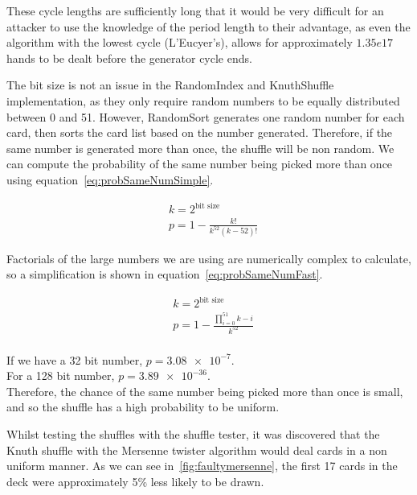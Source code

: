 These cycle lengths are sufficiently long that it would be very difficult
for an attacker to use the knowledge of the period length to their advantage,
as even the algorithm with the lowest cycle (L'Eucyer's), allows for
approximately $1.35e17$ hands to be dealt before the generator cycle ends.

The bit size is not an issue in the RandomIndex and KnuthShuffle
implementation, as they only require random numbers to be equally distributed
between 0 and 51. However, RandomSort generates one random number for each
card, then sorts the card list based on the number generated. Therefore, if
the same number is generated more than once, the shuffle will be non random.
We can compute the probability of the same number being picked more than once
using equation~\ref{eq:probSameNumSimple}.

\begin{equation} \label{eq:probSameNumSimple}
\begin{split}
& k = 2^\text{bit size}\\
& p = 1 - \frac{k!}{{k^{52}}(k - 52)!}
\end{split}
\end{equation}

Factorials of the large numbers we are using are numerically complex to
calculate, so a simplification is shown in equation~\ref{eq:probSameNumFast}.

\begin{equation} \label{eq:probSameNumFast}
\begin{split}
& k = 2^\text{bit size}\\
& p = 1 - \frac{\displaystyle\prod_{i=0}^{51} k - i}{k^{52}}
\end{split}
\end{equation}\\

If we have a 32 bit number, $p = 3.08\num{e-7}$.\\
For a 128 bit number, $p = 3.89\num{e-36}$.\\

Therefore, the chance of the same number being picked more than once is small,
and so the shuffle has a high probability to be uniform.

Whilst testing the shuffles with the shuffle tester, it was discovered that
the Knuth shuffle with the Mersenne twister algorithm would deal cards in a
non uniform manner. As we can see in~\ref{fig:faultymersenne}, the first 17
cards in the deck were approximately 5\% less likely to be drawn.

